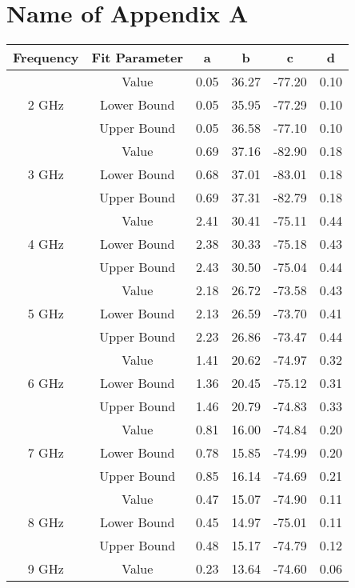 \chapter{Name of Appendix A}
{\tiny
\begin{center}
		\begin{tabular}{||c | c || c c c c||} 
			\hline
			Frequency & Fit Parameter & a & b & c & d \\ [0.5ex] 
			\hline\hline
			\multirow{3}{4em}{2 GHz} & Value & 0.05 & 36.27 & -77.20 & 0.10	 \\ 
			& Lower Bound & 0.05 & 35.95 & -77.29 & 0.10 \\ 
			& Upper Bound & 0.05 & 36.58 & -77.10 & 0.10 \\ 
			\hline
			\multirow{3}{4em}{3 GHz} & Value & 0.69 & 37.16 & -82.90 & 0.18  \\ 
			& Lower Bound & 0.68 & 37.01 & -83.01 & 0.18 \\ 
			& Upper Bound & 0.69 & 37.31 & -82.79 & 0.18 \\ 
			\hline
			\multirow{3}{4em}{4 GHz} & Value & 2.41 & 30.41 & -75.11 & 0.44 \\ 
			& Lower Bound & 2.38 & 30.33 & -75.18 & 0.43 \\ 
			& Upper Bound & 2.43 & 30.50 & -75.04 & 0.44 \\ 
			\hline
			\multirow{3}{4em}{5 GHz} & Value & 2.18 & 26.72 & -73.58 & 0.43 \\ 
			& Lower Bound & 2.13 & 26.59 & -73.70 & 0.41 \\ 
			& Upper Bound & 2.23 & 26.86 & -73.47 & 0.44 \\ 
			\hline
			\multirow{3}{4em}{6 GHz} & Value & 1.41 & 20.62 & -74.97 & 0.32 \\ 
			& Lower Bound & 1.36 & 20.45 & -75.12 & 0.31 \\ 
			& Upper Bound & 1.46 & 20.79 & -74.83 & 0.33 \\ 
			\hline
			\multirow{3}{4em}{7 GHz} & Value & 0.81 & 16.00 & -74.84 & 0.20 \\ 
			& Lower Bound & 0.78 & 15.85 & -74.99 & 0.20 \\ 
			& Upper Bound & 0.85 & 16.14 & -74.69 & 0.21 \\ 
			\hline
			\multirow{3}{4em}{8 GHz} & Value & 0.47 & 15.07 & -74.90 & 0.11 \\ 
			& Lower Bound & 0.45 & 14.97 & -75.01 & 0.11 \\ 
			& Upper Bound & 0.48 & 15.17 & -74.79 & 0.12 \\ 
			\hline
			\multirow{3}{4em}{9 GHz} & Value & 0.23 & 13.64 & -74.60 & 0.06 \\ 

\end{tabular}
\end{center}}
